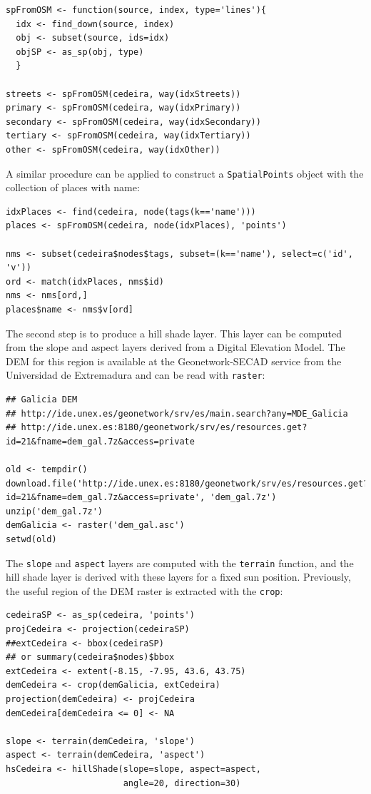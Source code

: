 \lstset{language=R}
\begin{lstlisting}
spFromOSM <- function(source, index, type='lines'){
  idx <- find_down(source, index)
  obj <- subset(source, ids=idx)
  objSP <- as_sp(obj, type)
  }

streets <- spFromOSM(cedeira, way(idxStreets))
primary <- spFromOSM(cedeira, way(idxPrimary))
secondary <- spFromOSM(cedeira, way(idxSecondary))
tertiary <- spFromOSM(cedeira, way(idxTertiary))
other <- spFromOSM(cedeira, way(idxOther))
\end{lstlisting}
  
A similar procedure can be applied to construct a \texttt{SpatialPoints}
object with the collection of places with name:

\lstset{language=R}
\begin{lstlisting}
idxPlaces <- find(cedeira, node(tags(k=='name')))
places <- spFromOSM(cedeira, node(idxPlaces), 'points')

nms <- subset(cedeira$nodes$tags, subset=(k=='name'), select=c('id', 'v'))
ord <- match(idxPlaces, nms$id)
nms <- nms[ord,]
places$name <- nms$v[ord]
\end{lstlisting}

The second step is to produce a hill shade layer. This layer can
be computed from the slope and aspect layers derived from a
Digital Elevation Model. The DEM for this region is available at
the Geonetwork-SECAD service from the Universidad de Extremadura
and can be read with \texttt{raster}:

\lstset{language=R}
\begin{lstlisting}
## Galicia DEM
## http://ide.unex.es/geonetwork/srv/es/main.search?any=MDE_Galicia
## http://ide.unex.es:8180/geonetwork/srv/es/resources.get?id=21&fname=dem_gal.7z&access=private

old <- tempdir()
download.file('http://ide.unex.es:8180/geonetwork/srv/es/resources.get?id=21&fname=dem_gal.7z&access=private', 'dem_gal.7z')
unzip('dem_gal.7z')
demGalicia <- raster('dem_gal.asc')
setwd(old)
\end{lstlisting}



The \texttt{slope} and \texttt{aspect} layers are computed with the \texttt{terrain}
function, and the hill shade layer is derived with these layers
for a fixed sun position. Previously, the useful region of the DEM
raster is extracted with the \texttt{crop}:


\lstset{language=R}
\begin{lstlisting}
cedeiraSP <- as_sp(cedeira, 'points')
projCedeira <- projection(cedeiraSP)
##extCedeira <- bbox(cedeiraSP) 
## or summary(cedeira$nodes)$bbox
extCedeira <- extent(-8.15, -7.95, 43.6, 43.75)
demCedeira <- crop(demGalicia, extCedeira)
projection(demCedeira) <- projCedeira
demCedeira[demCedeira <= 0] <- NA

slope <- terrain(demCedeira, 'slope')
aspect <- terrain(demCedeira, 'aspect')
hsCedeira <- hillShade(slope=slope, aspect=aspect,
                       angle=20, direction=30)
\end{lstlisting}

